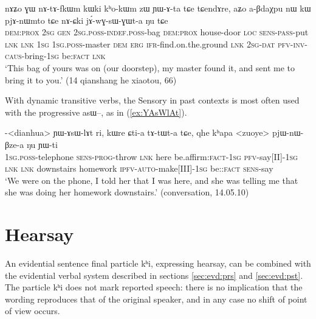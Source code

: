 \documentclass[oldfontcommands,oneside,a4paper,11pt]{article}
\newcommand{\ipa}[1]{{\phon \mbox{#1}}} %
\newcommand{\refb}[1]{(\ref{#1})}
\newcommand{\factual}[1]{\textsc{:fact}}
\begin{document}
\begin{exe}
\ex \label{ex:jAwGsWGWta}
\gll  \ipa{kɯki} 	\ipa{nɤʑo} 	\ipa{ɣɯ} 	\ipa{nɤ-tɤ-fkɯm} 	\ipa{kɯki} 	\ipa{kʰo-kɯm} 	\ipa{zɯ} 	\ipa{ɲɯ-ɤ-ta} 	\ipa{tɕe} 	\ipa{tɕendɤre,} \ipa{aʑo} 	\ipa{a-βdaχpu} 	\ipa{nɯ} 	\ipa{kɯ} 	\ipa{pjɤ-nɯmto} 	\ipa{tɕe} 	\ipa{nɤ-ɕki} 	\ipa{jɤ́-wɣ-sɯ-ɣɯt-a} 	\ipa{ŋu} \ipa{tɕe} \\
 \textsc{dem:prox}  \textsc{2sg} \textsc{gen} \textsc{2sg.poss-indef.poss}-bag \textsc{dem:prox} house-door \textsc{loc} \textsc{sens-pass}-put \textsc{lnk} \textsc{lnk} \textsc{1sg} \textsc{1sg.poss}-master \textsc{dem} \textsc{erg} \textsc{ifr}-find.on.the.ground  \textsc{lnk} \textsc{2sg-dat} \textsc{pfv-inv-caus}-bring-\textsc{1sg} be\factual{} \textsc{lnk}\\
\glt `This bag of yours was on (our doorstep), my master found it, and sent me to bring it to you.' (14 qianshang he xiaotou, 66)
\end{exe}

With dynamic transitive verbs, the Sensory in past contexts is most often used with the progressive \ipa{asɯ--}, as in \refb{ex:YAsWlAt}.

\begin{exe}
\ex \label{ex:YAsWlAt}
\gll  \ipa{a}-<dianhua> 	\ipa{ɲɯ-ɤsɯ-lɤt} 	\ipa{ri,} 	\ipa{kɯre} 	\ipa{ɕti-a} 	\ipa{tɤ-tɯt-a} 	\ipa{tɕe,} 	\ipa{qhe} 	\ipa{kʰapa} 	<zuoye> 	\ipa{pjɯ-nɯ-βze-a} 	\ipa{ŋu} 	\ipa{ɲɯ-ti} \\
\textsc{1sg.poss}-telephone \textsc{sens-prog}-throw \textsc{lnk} here be.affirm\factual{}-\textsc{1sg} \textsc{pfv}-say[II]-\textsc{1sg} \textsc{lnk} \textsc{lnk} downstairs homework \textsc{ipfv-auto}-make[III]-\textsc{1sg} be:\factual{} \textsc{sens}-say \\
\glt `We were on the phone, I told her that I was here, and she was telling me that she was doing her homework downstairs.' (conversation, 14.05.10)
\end{exe}

\section{Hearsay}
An evidential sentence final particle \ipa{kʰi}, expressing hearsay, can be combined with the evidential verbal system described in sections \ref{sec:evd:prs} and \ref{sec:evd:pst}. The particle \ipa{kʰi} does not mark reported speech: there is no implication that the wording reproduces that of the original speaker, and in any case no shift of point of view occurs. 
\end{document}
